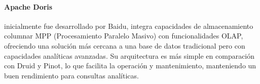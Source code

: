 \paragraph{Apache Doris} 
inicialmente fue desarrollado por Baidu, integra capacidades de almacenamiento columnar MPP (Procesamiento Paralelo Masivo) con funcionalidades OLAP, 
ofreciendo una solución más cercana a una base de datos tradicional pero con capacidades analíticas avanzadas. 
Su arquitectura es más simple en comparación con Druid y Pinot, lo que facilita la operación y mantenimiento, manteniendo un buen rendimiento para consultas analíticas.

\newpage